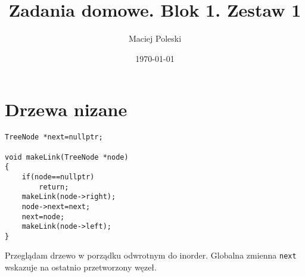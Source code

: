 \documentclass[a4paper,12pt]{article}
\title{Zadania domowe. Blok 1. Zestaw 1}
\author{Maciej Poleski}
\date{\today}
\begin{document}
\maketitle

\newpage

\section{Drzewa nizane}
\lstset{language=C++}
\begin{lstlisting}
TreeNode *next=nullptr;

void makeLink(TreeNode *node)
{
    if(node==nullptr)
        return;
    makeLink(node->right);
    node->next=next;
    next=node;
    makeLink(node->left);
}
\end{lstlisting}
Przeglądam drzewo w porządku odwrotnym do inorder. Globalna zmienna \lstinline!next! wskazuje na ostatnio przetworzony węzeł.
\end{document}
